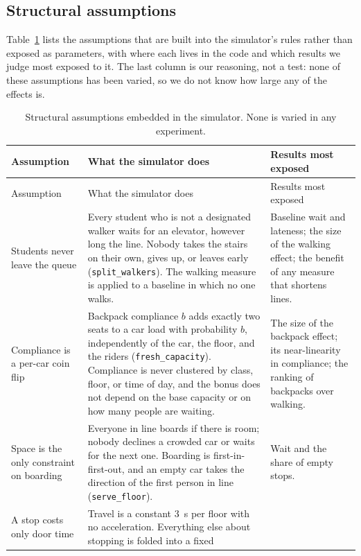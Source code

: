 \subsection{Structural assumptions}
\label{sec:struct}

Table~\ref{tab:struct} lists the assumptions that are built into the simulator's rules rather than exposed as
parameters, with where each lives in the code and which results we judge most exposed to it. The last column is
our reasoning, not a test: none of these assumptions has been varied, so we do not know how large any of the
effects is.

{\small
\begin{longtable}{>{\raggedright\arraybackslash}p{1.45in}>{\raggedright\arraybackslash}p{2.6in}>{\raggedright\arraybackslash}p{1.9in}}
\caption{Structural assumptions embedded in the simulator. None is varied in any experiment.}
\label{tab:struct}\\
\toprule
Assumption & What the simulator does & Results most exposed\\
\midrule
\endfirsthead
\toprule
Assumption & What the simulator does & Results most exposed\\
\midrule
\endhead
\bottomrule
\endfoot
Students never leave the queue &
Every student who is not a designated walker waits for an elevator, however long the line. Nobody takes the stairs
on their own, gives up, or leaves early (\texttt{split\_walkers}). The walking measure is applied to a baseline in
which no one walks. &
Baseline wait and lateness; the size of the walking effect; the benefit of any measure that shortens lines.\\
Compliance is a per-car coin flip &
Backpack compliance $b$ adds exactly two seats to a car load with probability $b$, independently of the car, the
floor, and the riders (\texttt{fresh\_capacity}). Compliance is never clustered by class, floor, or time of day, and the
bonus does not depend on the base capacity or on how many people are waiting. &
The size of the backpack effect; its near-linearity in compliance; the ranking of backpacks over walking.\\
Space is the only constraint on boarding &
Everyone in line boards if there is room; nobody declines a crowded car or waits for the next one. Boarding is
first-in-first-out, and an empty car takes the direction of the first person in line (\texttt{serve\_floor}). &
Wait and the share of empty stops.\\
A stop costs only door time &
Travel is a constant 3~s per floor with no acceleration. Everything else about stopping is folded into a fixed

\end{longtable}}

